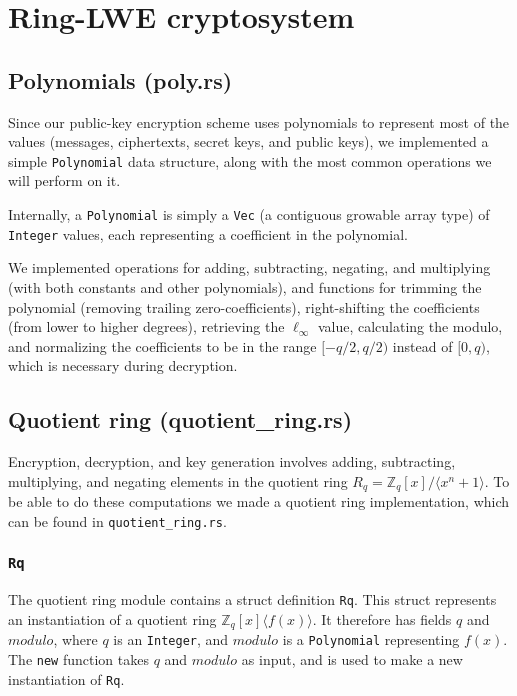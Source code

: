 \documentclass[../main.tex]{subfiles}
\begin{document}
\section{Ring-LWE cryptosystem}

\subsection{Polynomials (poly.rs)}

Since our public-key encryption scheme uses polynomials to represent most of the values (messages, ciphertexts, secret keys, and public keys), we implemented a simple \lstinline{Polynomial} data structure, along with the most common operations we will perform on it.

Internally, a \lstinline{Polynomial} is simply a \lstinline{Vec} (a contiguous growable array type) of \lstinline{Integer} values, each representing a coefficient in the polynomial.

We implemented operations for adding, subtracting, negating, and multiplying (with both constants and other polynomials), and functions for trimming the polynomial (removing trailing zero-coefficients), right-shifting the coefficients (from lower to higher degrees), retrieving the $\ell_\infty$ value, calculating the modulo, and normalizing the coefficients to be in the range $[-q/2, q/2)$ instead of $[0, q)$, which is necessary during decryption.

\subsection{Quotient ring (quotient\_ring.rs)}

Encryption, decryption, and key generation involves adding, subtracting, multiplying, and negating elements in the quotient ring $R_q = \mathbb{Z}_q[x]/\langle x^n + 1 \rangle$. To be able to do these computations we made a quotient ring implementation, which can be found in \lstinline{quotient_ring.rs}.

\subsubsection{\lstinline{Rq}}

The quotient ring module contains a struct definition \lstinline{Rq}.
This struct represents an instantiation of a quotient ring $\mathbb{Z}_q[x]  \langle f(x) \rangle$.
It therefore has fields $q$ and $modulo$, where $q$ is an \lstinline{Integer}, and $modulo$ is a \lstinline{Polynomial} representing $f(x)$. The \lstinline{new} function takes $q$ and $modulo$ as input, and is used to make a new instantiation of \lstinline{Rq}.
\end{document}
